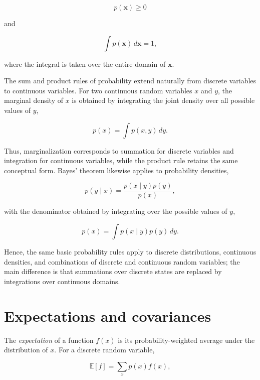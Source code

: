 \documentclass[10pt,twocolumn]{memoir}
\begin{document}
\begin{equation}
    p(\mathbf{x}) \geq 0
\end{equation}

and

\begin{equation}
    \int p(\mathbf{x})\,d\mathbf{x} = 1,
\end{equation}

where the integral is taken over the entire domain of $\mathbf{x}$.

The sum and product rules of probability extend naturally from discrete variables to continuous variables. For two continuous random variables $x$ and $y$, the marginal density of $x$ is obtained by integrating the joint density over all possible values of $y$,

\begin{equation}
    p(x) = \int p(x,y)\,dy.
\end{equation}

Thus, marginalization corresponds to summation for discrete variables and integration for continuous variables, while the product rule retains the same conceptual form. Bayes' theorem likewise applies to probability densities,

\begin{equation}
    p(y \mid x) = \frac{p(x \mid y)p(y)}{p(x)},
\end{equation}

with the denominator obtained by integrating over the possible values of $y$,

\begin{equation}
    p(x) = \int p(x \mid y)p(y)\,dy.
\end{equation}

Hence, the same basic probability rules apply to discrete distributions, continuous densities, and combinations of discrete and continuous random variables; the main difference is that summations over discrete states are replaced by integrations over continuous domains.

\section{Expectations and covariances}

The \textit{expectation} of a function $f(x)$ is its probability-weighted average under the distribution of $x$. For a discrete random variable,

\begin{equation}
    \mathbb{E}[f] = \sum_x p(x)f(x),
\end{equation}
\end{document}
